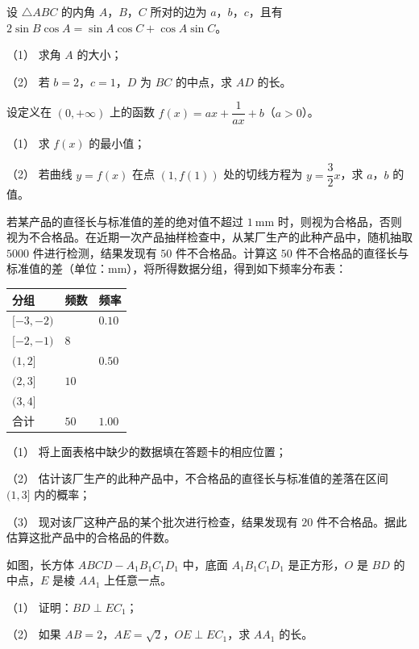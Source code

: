 \begin{question}
设 $\triangle ABC$ 的内角 $A$，$B$，$C$ 所对的边为 $a$，$b$，$c$，且有 $2\sin B\cos A=\sin A\cos C+\cos A\sin C$。

（1） 求角 $A$ 的大小；

（2） 若 $b=2$，$c=1$，$D$ 为 $BC$ 的中点，求 $AD$ 的长。

\end{question}
\begin{question}
设定义在 $(0,+\infty)$ 上的函数 $f(x)=ax+\dfrac1{ax}+b$（$a>0$）。

（1） 求 $f(x)$ 的最小值；

（2） 若曲线 $y=f(x)$ 在点 $(1,f(1))$ 处的切线方程为 $y=\dfrac32x$，求 $a$，$b$ 的值。

\end{question}
\begin{question}
若某产品的直径长与标准值的差的绝对值不超过 $1\ \mathrm{mm}$ 时，则视为合格品，否则视为不合格品。在近期一次产品抽样检查中，从某厂生产的此种产品中，随机抽取 $5000$ 件进行检测，结果发现有 $50$ 件不合格品。计算这 $50$ 件不合格品的直径长与标准值的差（单位：$\mathrm{mm}$），将所得数据分组，得到如下频率分布表：

\begin{center}
\begin{tabular}{lll}
\toprule
分组 & 频数 & 频率 \\
\midrule
$[-3,-2)$ &  & $0.10$ \\
$[-2,-1)$ & $8$ &  \\
$(1,2]$ &  & $0.50$ \\
$(2,3]$ & $10$ &  \\
$(3,4]$ &  &  \\
合计 & $50$ & $1.00$ \\
\bottomrule
\end{tabular}
\end{center}

（1） 将上面表格中缺少的数据填在答题卡的相应位置；

（2） 估计该厂生产的此种产品中，不合格品的直径长与标准值的差落在区间 $(1,3]$ 内的概率；

（3） 现对该厂这种产品的某个批次进行检查，结果发现有 $20$ 件不合格品。据此估算这批产品中的合格品的件数。

\Needspace{0.4\textheight}
\end{question}
\begin{question}
如图，长方体 $ABCD-A_1B_1C_1D_1$ 中，底面 $A_1B_1C_1D_1$ 是正方形，$O$ 是 $BD$ 的中点，$E$ 是棱 $AA_1$ 上任意一点。

（1） 证明：$BD\perp EC_1$；

（2） 如果 $AB=2$，$AE=\sqrt2$，$OE\perp EC_1$，求 $AA_1$ 的长。
\nopagebreak[4]
\begin{center}\end{center}
\nopagebreak[4]
\Needspace{0.4\textheight}
\end{question}
